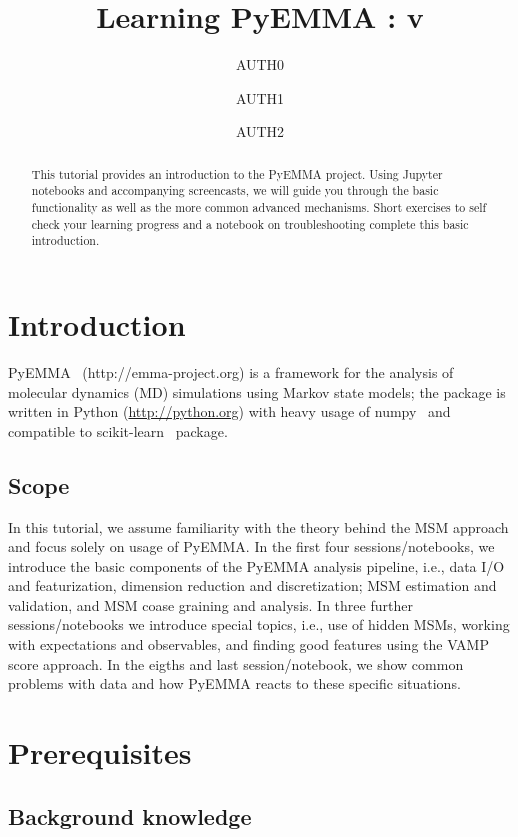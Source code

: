 \documentclass[9pt,tutorial,lineno,onehalfspacing]{livecoms}
\title{Learning PyEMMA : v\versionnumber}
\author[1\authfn{1}*]{AUTH0}
\author[1\authfn{1}*]{AUTH1}
\author[1*]{AUTH2}
\affil[1]{AFFILIATION}
\begin{document}
\begin{frontmatter}
\maketitle

\begin{abstract}
This tutorial provides an introduction to the PyEMMA project. Using Jupyter notebooks and accompanying screencasts, we will guide you through the basic functionality as well as the more common advanced mechanisms. Short exercises to self check your learning progress and a notebook on troubleshooting complete this basic introduction.
\end{abstract}

\end{frontmatter}

\section{Introduction}

PyEMMA~\cite{pyemma} (http://emma-project.org) is a framework for the analysis of molecular dynamics (MD) simulations using Markov state models; the package is written in Python (\url{http://python.org}) with heavy usage of numpy~\cite{numpy} and compatible to scikit-learn~\cite{sklearn} package.

\subsection{Scope}

In this tutorial, we assume familiarity with the theory behind the MSM approach and focus solely on usage of PyEMMA. In the first four sessions/notebooks, we introduce the basic components of the PyEMMA analysis pipeline, i.e., data I/O and featurization, dimension reduction and discretization; MSM estimation and validation, and MSM coase graining and analysis. In three further sessions/notebooks we introduce special topics, i.e., use of hidden MSMs, working with expectations and observables, and finding good features using the VAMP score approach. In the eigths and last session/notebook, we show common problems with data and how PyEMMA reacts to these specific situations.

\section{Prerequisites}


\subsection{Background knowledge}
\end{document}
